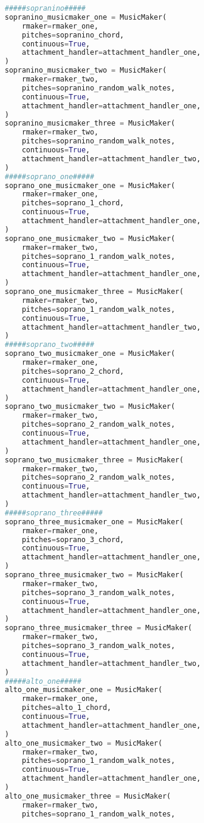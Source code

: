 \begin{lstlisting}[language=Python, caption=Invocation Source Code]
#####sopranino#####
sopranino_musicmaker_one = MusicMaker(
    rmaker=rmaker_one,
    pitches=sopranino_chord,
    continuous=True,
    attachment_handler=attachment_handler_one,
)
sopranino_musicmaker_two = MusicMaker(
    rmaker=rmaker_two,
    pitches=sopranino_random_walk_notes,
    continuous=True,
    attachment_handler=attachment_handler_one,
)
sopranino_musicmaker_three = MusicMaker(
    rmaker=rmaker_two,
    pitches=sopranino_random_walk_notes,
    continuous=True,
    attachment_handler=attachment_handler_two,
)
#####soprano_one#####
soprano_one_musicmaker_one = MusicMaker(
    rmaker=rmaker_one,
    pitches=soprano_1_chord,
    continuous=True,
    attachment_handler=attachment_handler_one,
)
soprano_one_musicmaker_two = MusicMaker(
    rmaker=rmaker_two,
    pitches=soprano_1_random_walk_notes,
    continuous=True,
    attachment_handler=attachment_handler_one,
)
soprano_one_musicmaker_three = MusicMaker(
    rmaker=rmaker_two,
    pitches=soprano_1_random_walk_notes,
    continuous=True,
    attachment_handler=attachment_handler_two,
)
#####soprano_two#####
soprano_two_musicmaker_one = MusicMaker(
    rmaker=rmaker_one,
    pitches=soprano_2_chord,
    continuous=True,
    attachment_handler=attachment_handler_one,
)
soprano_two_musicmaker_two = MusicMaker(
    rmaker=rmaker_two,
    pitches=soprano_2_random_walk_notes,
    continuous=True,
    attachment_handler=attachment_handler_one,
)
soprano_two_musicmaker_three = MusicMaker(
    rmaker=rmaker_two,
    pitches=soprano_2_random_walk_notes,
    continuous=True,
    attachment_handler=attachment_handler_two,
)
#####soprano_three#####
soprano_three_musicmaker_one = MusicMaker(
    rmaker=rmaker_one,
    pitches=soprano_3_chord,
    continuous=True,
    attachment_handler=attachment_handler_one,
)
soprano_three_musicmaker_two = MusicMaker(
    rmaker=rmaker_two,
    pitches=soprano_3_random_walk_notes,
    continuous=True,
    attachment_handler=attachment_handler_one,
)
soprano_three_musicmaker_three = MusicMaker(
    rmaker=rmaker_two,
    pitches=soprano_3_random_walk_notes,
    continuous=True,
    attachment_handler=attachment_handler_two,
)
#####alto_one#####
alto_one_musicmaker_one = MusicMaker(
    rmaker=rmaker_one,
    pitches=alto_1_chord,
    continuous=True,
    attachment_handler=attachment_handler_one,
)
alto_one_musicmaker_two = MusicMaker(
    rmaker=rmaker_two,
    pitches=soprano_1_random_walk_notes,
    continuous=True,
    attachment_handler=attachment_handler_one,
)
alto_one_musicmaker_three = MusicMaker(
    rmaker=rmaker_two,
    pitches=soprano_1_random_walk_notes,

\end{lstlisting}
